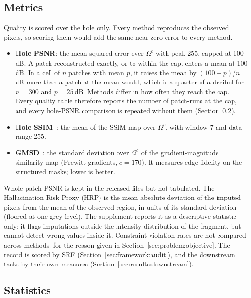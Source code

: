 \documentclass[final,3p]{elsarticle}
\begin{document}
\subsection{Metrics}
\label{sec:experiments:metrics}

Quality is scored over the hole only. Every method reproduces the observed pixels, so scoring them would add the same near-zero error to every method.
\begin{itemize}
  \item \textbf{Hole PSNR}: the mean squared error over $\Omega^{c}$ with peak 255, capped at 100\,dB. A patch reconstructed exactly, or to within the cap, enters a mean at 100\,dB. In a cell of $n$ patches with mean $\bar{p}$, it raises the mean by $(100 - \bar{p})/n$\,dB more than a patch at the mean would, which is a quarter of a decibel for $n = 300$ and $\bar{p} = 25$\,dB. Methods differ in how often they reach the cap. Every quality table therefore reports the number of patch-runs at the cap, and every hole-PSNR comparison is repeated without them (Section~\ref{sec:experiments:stats}).
  \item \textbf{Hole SSIM}~\cite{wang2004image}: the mean of the SSIM map over $\Omega^{c}$, with window 7 and data range 255.
  \item \textbf{GMSD}~\cite{xue2014gradient}: the standard deviation over $\Omega^{c}$ of the gradient-magnitude similarity map (Prewitt gradients, $c = 170$). It measures edge fidelity on the structured masks; lower is better.
\end{itemize}
Whole-patch PSNR is kept in the released files but not tabulated. The Hallucination Risk Proxy (HRP) is the mean absolute deviation of the imputed pixels from the mean of the observed region, in units of its standard deviation (floored at one grey level). The supplement reports it as a descriptive statistic only: it flags imputations outside the intensity distribution of the fragment, but cannot detect wrong values inside it. Constraint-violation rates are not compared across methods, for the reason given in Section~\ref{sec:problem:objective}. The record is scored by SRF (Section~\ref{sec:framework:audit}), and the downstream tasks by their own measures (Section~\ref{sec:results:downstream}).

\subsection{Statistics}
\label{sec:experiments:stats}
\end{document}
